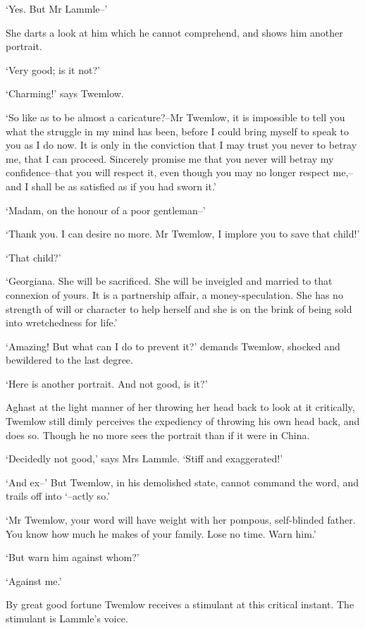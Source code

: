 ‘Yes. But Mr Lammle--’

She darts a look at him which he cannot comprehend, and shows him
another portrait.

‘Very good; is it not?’

‘Charming!’ says Twemlow.

‘So like as to be almost a caricature?--Mr Twemlow, it is impossible
to tell you what the struggle in my mind has been, before I could bring
myself to speak to you as I do now. It is only in the conviction that I
may trust you never to betray me, that I can proceed. Sincerely promise
me that you never will betray my confidence--that you will respect it,
even though you may no longer respect me,--and I shall be as satisfied
as if you had sworn it.’

‘Madam, on the honour of a poor gentleman--’

‘Thank you. I can desire no more. Mr Twemlow, I implore you to save that
child!’

‘That child?’

‘Georgiana. She will be sacrificed. She will be inveigled and married
to that connexion of yours. It is a partnership affair, a
money-speculation. She has no strength of will or character to help
herself and she is on the brink of being sold into wretchedness for
life.’

‘Amazing! But what can I do to prevent it?’ demands Twemlow, shocked and
bewildered to the last degree.

‘Here is another portrait. And not good, is it?’

Aghast at the light manner of her throwing her head back to look at it
critically, Twemlow still dimly perceives the expediency of throwing his
own head back, and does so. Though he no more sees the portrait than if
it were in China.

‘Decidedly not good,’ says Mrs Lammle. ‘Stiff and exaggerated!’

‘And ex--’ But Twemlow, in his demolished state, cannot command the
word, and trails off into ‘--actly so.’

‘Mr Twemlow, your word will have weight with her pompous, self-blinded
father. You know how much he makes of your family. Lose no time. Warn
him.’

‘But warn him against whom?’

‘Against me.’

By great good fortune Twemlow receives a stimulant at this critical
instant. The stimulant is Lammle’s voice.

